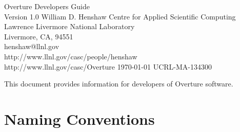 \documentclass{article}
\begin{document}

\def\R      {{\bf R}}
\def\Dv     {{\bf D}}
\def\bv     {{\bf b}}
\def\fv     {{\bf f}}
\def\Fv     {{\bf F}}
\def\gv     {{\bf g}}
\def\iv     {{\bf i}}
\def\jv     {{\bf j}}
\def\kv     {{\bf k}}
\def\nv     {{\bf n}}
\def\rv     {{\bf r}}
\def\tv     {{\bf t}}
\def\uv     {{\bf u}}
\def\Uv     {{\bf U}}
\def\vv     {{\bf v}}
\def\Vv     {{\bf V}}
\def\xv     {{\bf x}}
\def\yv     {{\bf y}}
\def\zv     {{\bf z}}
\def\lt     {{<}}
\def\grad    {\nabla}
\def\comma  {~~~,~~}
\def\uvd    {{\bf U}}
\def\ud     {{    U}}
\def\pd     {{    P}}
\def\calo{{\cal O}}

\def\nv {{\ff nv }}
\def\ng {{\ff ng }}
\def\bc {{\ff bc}}

\vspace{5\baselineskip}
\begin{flushleft}
{\Large
Overture Developers Guide \\
Version 1.0
}
\vspace{2\baselineskip}
William D. Henshaw
\vspace{\baselineskip}
Centre for Applied Scientific Computing \\
Lawrence Livermore National Laboratory    \\
Livermore, CA, 94551   \\
henshaw@llnl.gov \\
http://www.llnl.gov/casc/people/henshaw \\
http://www.llnl.gov/casc/Overture
\vspace{\baselineskip}
\today
\vspace{\baselineskip}
UCRL-MA-134300

\vspace{4\baselineskip}

This document provides information for developers of Overture software.
\end{flushleft}

\tableofcontents


\vfill\eject
\section{Naming Conventions}
\end{document}
